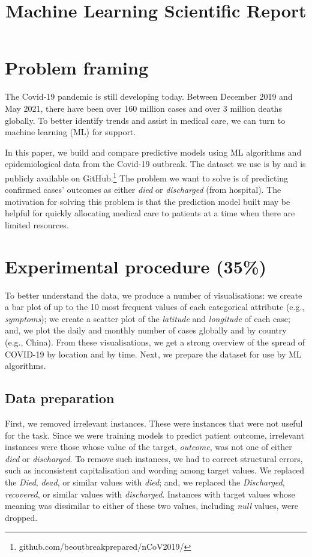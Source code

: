 \documentclass[twoside,11pt]{article}
\begin{document}
\title{Machine Learning Scientific Report}



\maketitle

\section{Problem framing}
The Covid‑19 pandemic is still developing today. Between December 2019 and May 2021, there have been over 160 million cases and over 3 million deaths globally. To better identify trends and assist in medical care, we can turn to machine learning (ML) for support.

In this paper, we build and compare predictive models using ML algorithms and epidemiological data from the Covid-19 outbreak. The dataset we use is by \cite{xu2020Epidemiological} and is publicly available on GitHub.\footnote{github.com/beoutbreakprepared/nCoV2019/} The problem we want to solve is of predicting confirmed cases' outcomes as either \emph{died} or \emph{discharged} (from hospital). The motivation for solving this problem is that the prediction model built may be helpful for quickly allocating medical care to patients at a time when there are limited resources. 

\section{Experimental procedure (35\%)}
To better understand the data, we produce a number of visualisations: we create a bar plot of up to the 10 most frequent values of each categorical attribute (e.g., \emph{symptoms}); we create a scatter plot of the \emph{latitude} and \emph{longitude} of each case; and, we plot the daily and monthly number of cases globally and by country (e.g., China). From these visualisations, we get a strong overview of the spread of COVID-19 by location and by time. Next, we prepare the dataset for use by ML algorithms.

\subsection{Data preparation}
First, we removed irrelevant instances. These were instances that were not useful for the task. Since we were training models to predict patient outcome, irrelevant instances were those whose value of the target, \emph{outcome}, was not one of either \emph{died} or \emph{discharged}. To remove such instances, we had to correct structural errors, such as inconsistent capitalisation and wording among target values. We replaced the \emph{Died}, \emph{dead}, or similar values with \emph{died}; and, we replaced the \emph{Discharged}, \emph{recovered}, or similar values with \emph{discharged}. Instances with target values whose meaning was dissimilar to either of these two values, including \emph{null} values, were dropped.
\end{document}
